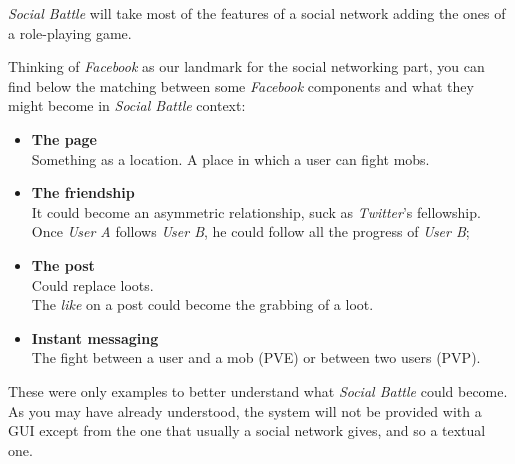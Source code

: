 		\noindent \textit{Social Battle} will take most of the features of a social network adding the 
		ones of a role-playing game.

		\noindent Thinking of \textit{Facebook} as our landmark for the social networking part, 
		you can find below the matching between some \textit{Facebook} components and what 
		they might become in \textit{Social Battle} context:
		\begin{itemize}
			\item \textbf{The page}\\
			Something as a location. A place in which a user can fight mobs.

			\item \textbf{The friendship}\\
			It could become an asymmetric relationship, suck as \textit{Twitter}'s fellowship.
			Once \textit{User A} follows \textit{User B}, he could follow all the progress
			of \textit{User B};

			\item \textbf{The post}\\
			Could replace loots.\\
			The \textit{like} on a post could become the grabbing of a loot.

			\item \textbf{Instant messaging}\\
			The fight between a user and a mob (PVE) or between two users (PVP).
		\end{itemize}

		\noindent These were only examples to better understand what \textit{Social Battle} could become.\\
		As you may have already understood, the system will not be provided with a GUI except from the one 
		that usually a social network gives, and so a textual one.

